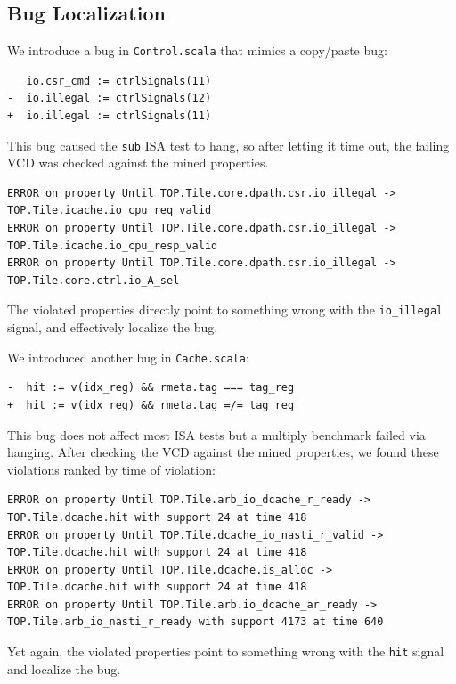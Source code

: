 \documentclass[acmlarge,11pt]{acmart}
\begin{document}
\subsection{Bug Localization}
We introduce a bug in \texttt{Control.scala} that mimics a copy/paste bug:
\begin{verbatim}
   io.csr_cmd := ctrlSignals(11)
-  io.illegal := ctrlSignals(12)
+  io.illegal := ctrlSignals(11)
\end{verbatim}
This bug caused the \texttt{sub} ISA test to hang, so after letting it time out, the failing VCD was checked against the mined properties.
\begin{verbatim}
ERROR on property Until TOP.Tile.core.dpath.csr.io_illegal -> TOP.Tile.icache.io_cpu_req_valid
ERROR on property Until TOP.Tile.core.dpath.csr.io_illegal -> TOP.Tile.icache.io_cpu_resp_valid
ERROR on property Until TOP.Tile.core.dpath.csr.io_illegal -> TOP.Tile.core.ctrl.io_A_sel
\end{verbatim}

The violated properties directly point to something wrong with the \texttt{io\_illegal} signal, and effectively localize the bug.

We introduced another bug in \texttt{Cache.scala}:
\begin{verbatim}
-  hit := v(idx_reg) && rmeta.tag === tag_reg
+  hit := v(idx_reg) && rmeta.tag =/= tag_reg
\end{verbatim}

This bug does not affect most ISA tests but a multiply benchmark failed via hanging.
After checking the VCD against the mined properties, we found these violations ranked by time of violation:
\begin{verbatim}
ERROR on property Until TOP.Tile.arb_io_dcache_r_ready -> TOP.Tile.dcache.hit with support 24 at time 418
ERROR on property Until TOP.Tile.dcache_io_nasti_r_valid -> TOP.Tile.dcache.hit with support 24 at time 418
ERROR on property Until TOP.Tile.dcache.is_alloc -> TOP.Tile.dcache.hit with support 24 at time 418
ERROR on property Until TOP.Tile.arb.io_dcache_ar_ready -> TOP.Tile.arb_io_nasti_r_ready with support 4173 at time 640
\end{verbatim}

Yet again, the violated properties point to something wrong with the \texttt{hit} signal and localize the bug.
\end{document}
